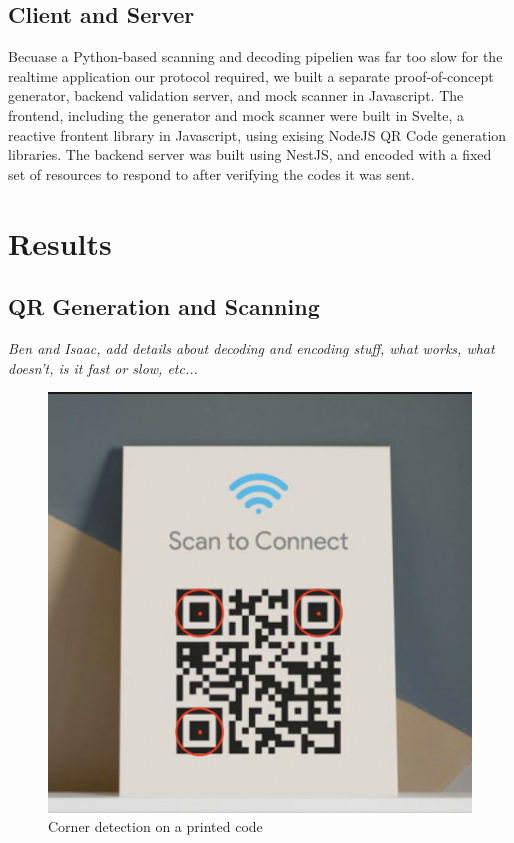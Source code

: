 \documentclass[10pt,twocolumn,letterpaper]{article}
\begin{document}
\subsection{Client and Server}

Becuase a Python-based scanning and decoding pipelien was far too slow for the realtime application our protocol required, we built a separate proof-of-concept generator, backend validation server, and mock scanner in Javascript. The frontend, including the generator and mock scanner were built in Svelte, a reactive frontent library in Javascript, using exising NodeJS QR Code generation libraries. The backend server was built using NestJS, and encoded with a fixed set of resources to respond to after verifying the codes it was sent.


\section{Results}

\subsection{QR Generation and Scanning}

\textit{Ben and Isaac, add details about decoding and encoding stuff, what works, what doesn't, is it fast or slow, etc...}

\begin{figure}[t]
   \begin{center}
      \includegraphics[width=0.8\linewidth]{print.png}
   \end{center}
      \caption{Corner detection on a printed code}
   \label{fig:print}
\end{figure}
\end{document}
